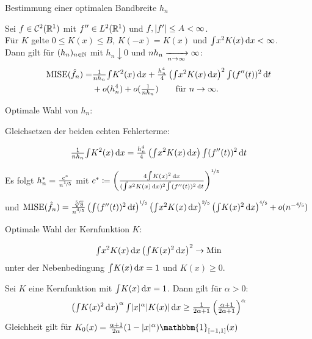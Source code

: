 \documentclass{cheat-sheet}
\newcommand{\ind}{\mathbbm{1}} %
\newcommand{\Cont}{\mathcal{C}} %
\DeclareMathOperator{\MISE}{MISE} %
\begin{document}
\begin{ziel}
  Bestimmung einer optimalen Bandbreite $h_n$
\end{ziel}

\begin{satz}
  Sei $f \in \Cont^2(\R^1)$ mit $f'' \in L^2(\mathbb{R}^1)$ und $f, \lvert f'\rvert \leq A < \infty$. \\
  Für $K$ gelte $0 \leq K(x) \leq B$, $K(-x) = K(x)$ und ${\textstyle \int} x^2 K(x) \,\mathrm{d} x < \infty$. \\
  Dann gilt für $(h_n)_{n \in \mathbb{N}}$ mit $h_n \downarrow 0$ und $n h_n \xrightarrow[n \to \infty]{} \infty$:
  \begin{align*}
    \MISE(\hat{f}_n) = & \tfrac{1}{n h_n} \IInt{K^2(x)}{x} + \tfrac{h_n^4}{4} \left( \IInt{x^2 K(x)}{x} \right)^2 \IInt{(f''(t))^2}{t} \\
    & + o(h_n^4) + o(\tfrac{1}{n h_n}) \qquad
    \text{für } n \to \infty.
  \end{align*}
\end{satz}


Optimale Wahl von $h_n$:

Gleichsetzen der beiden echten Fehlerterme:

\[
  \tfrac{1}{n h_n} {\textstyle \int} K^2(x) \,\mathrm{d} x = \tfrac{h_n^4}{4} \left( {\textstyle \int} x^2 K(x) \,\mathrm{d} x \right) {\textstyle \int} (f''(t))^2 \,\mathrm{d} t
\]

Es folgt $h_n^{*} = \tfrac{c^*}{n^{\nicefrac{1}{5}}}$ mit $c^* \coloneqq \left( \frac{4 {\textstyle \int} K(x)^2 \,\mathrm{d} x}{({\textstyle \int} x^2 K(x) \,\mathrm{d} x)^2 {\textstyle \int} (f''(t))^2 \,\mathrm{d} t} \right)^{\nicefrac{1}{5}}$

und $\MISE(\hat{f}_n) = \tfrac{\sqrt[5]{8}}{n^{\nicefrac{4}{5}}} \left( \IInt{(f''(t))^2}{t} \right)^{\nicefrac{1}{5}} \left( \IInt{x^2 K(x)}{x} \right)^{\nicefrac{2}{5}} \left( \IInt{K(x)^2}{x} \right)^{\nicefrac{4}{5}} + o(n^{- \nicefrac{4}{5}})$

Optimale Wahl der Kernfunktion $K$:

\[
  {\textstyle \int} x^2 K(x) \,\mathrm{d} x \left( {\textstyle \int} K(x)^2 \,\mathrm{d} x \right)^2 \to \text{Min}
\]
unter der Nebenbedingung ${\textstyle \int} K(x) \,\mathrm{d} x = 1$ und $K(x) \geq 0$.

\begin{satz}
  Sei $K$ eine Kernfunktion mit ${\textstyle \int} K(x) \,\mathrm{d} x = 1$.
  Dann gilt für $\alpha > 0$:
  \[
    \left( {\textstyle \int} K(x)^2 \,\mathrm{d} x \right)^\alpha {\textstyle \int} \lvert x\rvert^\alpha \lvert K(x)\rvert \,\mathrm{d} x \geq \tfrac{1}{2 \alpha + 1} \left( \tfrac{\alpha + 1}{2 \alpha + 1} \right)^\alpha
  \]
  Gleichheit gilt für $K_0(x) = \tfrac{\alpha+1}{2 \alpha} (1 - \abs{x}^\alpha) \ind_{\cinterval{-1}{1}} (x)$
\end{satz}
\end{document}
